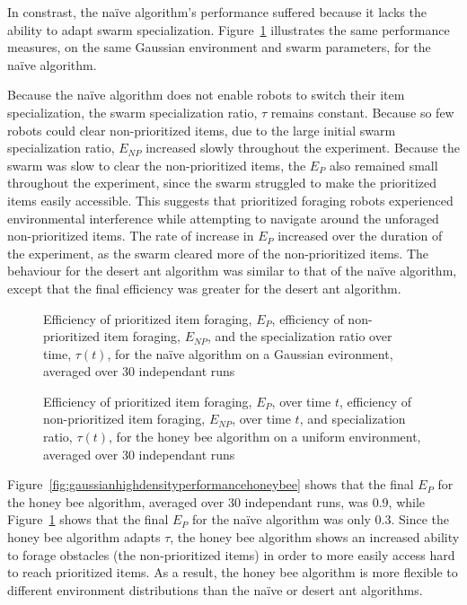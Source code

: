 In constrast, the na\"ive algorithm's performance suffered because it lacks the ability to adapt swarm specialization. Figure~\ref{fig:gaussianhighdensityperformancenaive} illustrates the same performance measures, on the same Gaussian environment and swarm parameters, for the na\"ive algorithm.  

Because the na\"ive algorithm does not enable robots to switch their item specialization, the swarm specialization ratio, $\tau$ remains constant. Because so few robots could clear non-prioritized items, due to the large initial swarm specialization ratio, $E_{NP}$ increased slowly throughout the experiment. Because the swarm was slow to clear the non-prioritized items, the $E_P$ also remained small throughout the experiment, since the swarm struggled to make the prioritized items easily accessible. This suggests that prioritized foraging robots experienced environmental interference while attempting to navigate around the unforaged non-prioritized items. The rate of increase in $E_P$ increased over the duration of the experiment, as the swarm cleared more of the non-prioritized items. The behaviour for the desert ant algorithm was similar to that of the na\"ive algorithm, except that the final efficiency was greater for the desert ant algorithm.


\begin{figure}[!htbp]
\centering
\small
\resizebox{\textwidth}{!}{}
\caption{Efficiency of prioritized item foraging, $E_P$, efficiency of non-prioritized item foraging, $E_{NP}$, and the specialization ratio over time, $\tau(t)$, for the na\"ive algorithm on a Gaussian evironment, averaged over 30 independant runs}
\label{fig:gaussianhighdensityperformancenaive}
\end{figure}

\begin{figure}[!htb]
\centering
\small
\resizebox{\textwidth}{!}{}
\caption{Efficiency of prioritized item foraging, $E_P$, over time $t$, efficiency of non-prioritized item foraging, $E_{NP}$, over time $t$, and specialization ratio, $\tau(t)$, for the honey bee algorithm on a uniform environment, averaged over 30 independant runs}
\label{fig:uniformhighdensityperformancehoneybee}
\end{figure}


Figure~\ref{fig:gaussianhighdensityperformancehoneybee} shows that the final $E_P$ for the honey bee algorithm, averaged over 30 independant runs, was 0.9, while Figure~\ref{fig:gaussianhighdensityperformancenaive} shows that the final $E_P$ for the na\"ive algorithm was only 0.3. Since the honey bee algorithm adapts $\tau$, the honey bee algorithm shows an increased ability to forage obstacles (the non-prioritized items) in order to more easily access hard to reach prioritized items. As a result, the honey bee algorithm is more flexible to different environment distributions than the na\"ive or desert ant algorithms.


